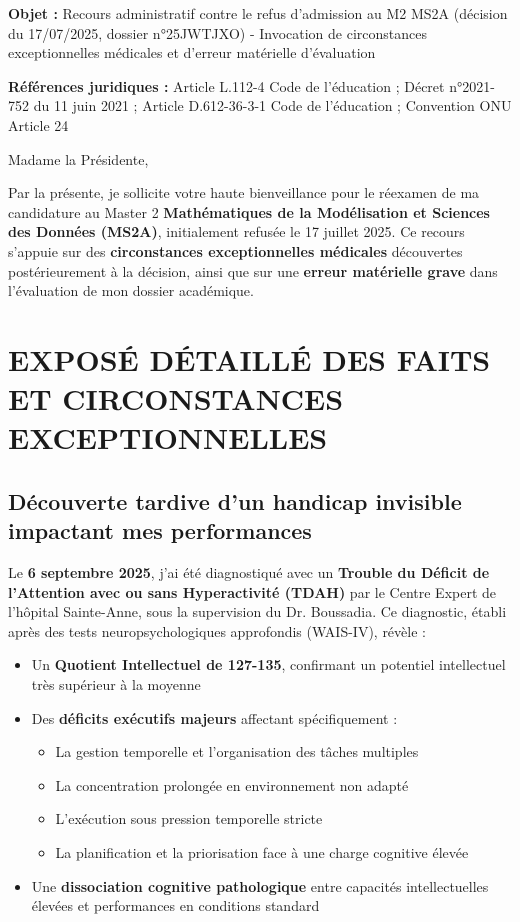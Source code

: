 \documentclass[12pt,french,a4paper]{article}
\begin{document}
\vspace{0.5cm}

\noindent\textbf{Objet :} Recours administratif contre le refus d'admission au M2 MS2A (décision du 17/07/2025, dossier n°25JWTJXO) - Invocation de circonstances exceptionnelles médicales et d'erreur matérielle d'évaluation

\noindent\textbf{Références juridiques :} Article L.112-4 Code de l'éducation ; Décret n°2021-752 du 11 juin 2021 ; Article D.612-36-3-1 Code de l'éducation ; Convention ONU Article 24

\vspace{1cm}

\noindent Madame la Présidente,


Par la présente, je sollicite votre haute bienveillance pour le réexamen de ma candidature au Master 2 \textbf{Mathématiques de la Modélisation et Sciences des Données (MS2A)}, initialement refusée le 17 juillet 2025. Ce recours s'appuie sur des \textbf{circonstances exceptionnelles médicales} découvertes postérieurement à la décision, ainsi que sur une \textbf{erreur matérielle grave} dans l'évaluation de mon dossier académique.

\section{EXPOSÉ DÉTAILLÉ DES FAITS ET CIRCONSTANCES EXCEPTIONNELLES}

\subsection{Découverte tardive d'un handicap invisible impactant mes performances}

Le \textbf{6 septembre 2025}, j'ai été diagnostiqué avec un \textbf{Trouble du Déficit de l'Attention avec ou sans Hyperactivité (TDAH)} par le Centre Expert de l'hôpital Sainte-Anne, sous la supervision du Dr. Boussadia. Ce diagnostic, établi après des tests neuropsychologiques approfondis (WAIS-IV), révèle :

\begin{itemize}[leftmargin=2cm]
\item Un \textbf{Quotient Intellectuel de 127-135}, confirmant un potentiel intellectuel très supérieur à la moyenne
\item Des \textbf{déficits exécutifs majeurs} affectant spécifiquement :
  \begin{itemize}
  \item La gestion temporelle et l'organisation des tâches multiples
  \item La concentration prolongée en environnement non adapté
  \item L'exécution sous pression temporelle stricte
  \item La planification et la priorisation face à une charge cognitive élevée
  \end{itemize}
\item Une \textbf{dissociation cognitive pathologique} entre capacités intellectuelles élevées et performances en conditions standard
\end{itemize}
\end{document}
